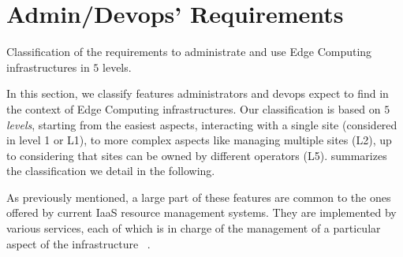 
\section{Admin/Devops' Requirements}
\label{sec:requirements}

%   

\begin{table*}
    \centering
        
    \caption{Classification of the requirements to administrate and use Edge
    Computing infrastructures in $5$ levels.}
    \label{tab:requirements}
\end{table*}

In this section, we classify features administrators and devops expect
to find in the context of Edge Computing infrastructures.
Our classification is based on $5$ \emph{levels}, starting from the easiest
aspects, \ie interacting with a single site (considered in level 1 or L1), to
more complex aspects like managing multiple sites (L2), up to considering that
sites can be owned by different operators (L5).
 summarizes the classification we detail in the following. 

As previously mentioned, a large part of these features are common to
the ones offered by current IaaS resource management systems. They are
implemented by various services, each of which is in charge of the
management of a particular aspect of the infrastructure
~\cite{moreno2012csp}.

